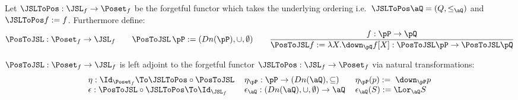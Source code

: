 \documentclass{article}
\begin{document}
\begin{definition}
\label{def:free_jsl_on_poset}
Let $\JSLToPos : \JSL_f \to \Poset_f$ be the forgetful functor which takes the underlying ordering i.e.\ $\JSLToPos\aQ = (Q,\leq_\aQ)$ and $\JSLToPos f := f$. Furthermore define:
\[
\PosToJSL : \Poset_f \to \JSL_f
\qquad
\PosToJSL \,\pP := (Dn(\pP),\cup,\emptyset)
\qquad
\dfrac{f : \pP \to \pQ}{\PosToJSL f := \lambda X.\down_{\pQ} f[X] : \PosToJSL \pP \to \PosToJSL \pQ}
\]
\end{definition}


\begin{theorem}
\label{thm:free_jsl_on_poset}
\item
$\PosToJSL : \Poset_f \to \JSL_f$ is left adjoint to the forgetful functor $\JSLToPos : \JSL_f \to \Poset_f$ via natural transformations:
\[
\begin{tabular}{lll}
$\eta : \Id_{\Poset_f} \To \JSLToPos \circ \PosToJSL$
&
$\eta_\pP : \pP \to (Dn(\aQ),\subseteq)$
&
$\eta_\pP(p) := \; \down_\pP p$
\\
$\epsilon : \PosToJSL \circ \JSLToPos \To \Id_{\JSL_f}$
&
$\epsilon_\aQ : (Dn(\aQ),\cup,\emptyset) \to \aQ$
&
$\epsilon_\aQ(S) := \Lor_\aQ S$
\end{tabular}
\]
\end{theorem}
\end{document}
